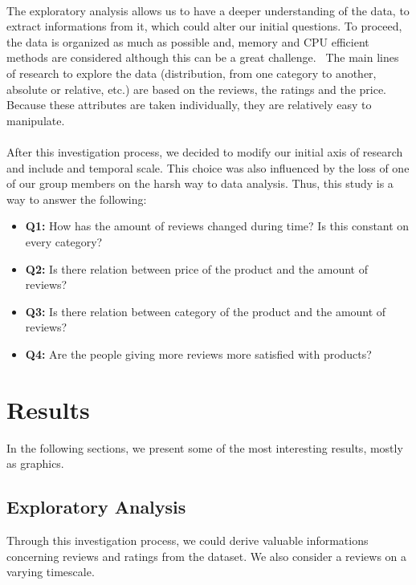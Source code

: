 \documentclass[11pt]{article}
\begin{document}
\paragraph{}
The exploratory analysis allows us to have a deeper understanding of the data, to extract informations from it, which could alter our initial questions. To proceed, the data is organized as much as possible and, memory and CPU efficient methods are considered although this can be a great challenge. 
The main lines of research to explore the data (distribution, from one category to another, absolute or relative, etc.) are based on the reviews, the ratings and the price. Because these attributes are taken individually, they are relatively easy to manipulate.

\paragraph{}
After this investigation process, we decided to modify our initial axis of research and include and temporal scale. This choice was also influenced by the loss of one of our group members on the harsh way to data analysis. Thus, this study is a way to answer the following:

\begin{itemize}
\item {\bf Q1:} How has the amount of reviews changed during time? Is this constant on every category?
\item {\bf Q2:} Is there relation between price of the product and the amount of reviews?
\item {\bf Q3:} Is there relation between category of the product and the amount of reviews?
\item {\bf Q4:} Are the people giving more reviews more satisfied with products?
\end{itemize}

\section{Results}

In the following sections, we present some of the most interesting results, mostly as graphics.

\subsection{Exploratory Analysis}

Through this investigation process, we could derive valuable informations concerning reviews and ratings from the dataset. We also consider a reviews on a varying timescale.
\end{document}
